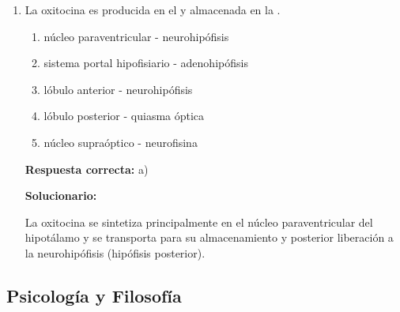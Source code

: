 \begin{enumerate}[resume]
	\vspace{2mm}
	\textbf{Solucionario:}

	I(F): El colédoco se forma por la unión del conducto cístico y el hepático común.\\
	II(V): El hígado produce bilis. \\
	III(F): Se sintetizan a partir del colesterol. \\
	IV(V): La vesícula almacena la bilis. \\
	V(V): La emulsificación facilita la digestión de grasas.

	\vspace{6mm}

	\item La oxitocina es producida en el \underline{\hspace{3cm}} y almacenada en la \underline{\hspace{3cm}}.
	\begin{enumerate}[label=\alph*)]
		\item núcleo paraventricular - neurohipófisis
		\item sistema portal hipofisiario - adenohipófisis
		\item lóbulo anterior - neurohipófisis
		\item lóbulo posterior - quiasma óptica
		\item núcleo supraóptico - neurofisina
	\end{enumerate}
	\textbf{Respuesta correcta:} a)

	\vspace{2mm}
	\textbf{Solucionario:}

	La oxitocina se sintetiza principalmente en el núcleo paraventricular del hipotálamo y se transporta para su almacenamiento y posterior liberación a la neurohipófisis (hipófisis posterior).

	\vspace{6mm}





\end{enumerate}



\subsection*{Psicología y Filosofía}

